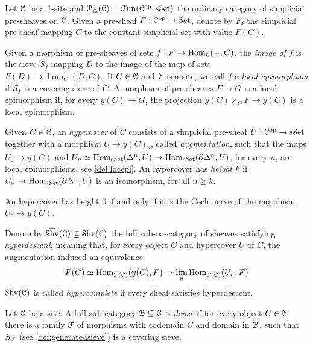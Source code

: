 \documentclass[10pt]{amsart}
\begin{document}
Let $\mathcal{C}$ be a 1-site and $\mathcal{P}_\Delta(\mathcal{C})=\mathcal{F}\mathrm{un}(\mathcal{C}^{\mathrm{op}},\mathrm{s}\mathcal{S}\mathrm{et})$ the ordinary category of simplicial pre-sheaves on $\mathcal{C}$. Given a pre-sheaf $F:\mathcal{C}^{\mathrm{op}}\to\mathcal{S}\mathrm{et}$, denote by $F_\delta$ the simplicial pre-sheaf mapping $C$ to the constant simplicial set with value $F(C)$. 
\begin{definition}\label{def:locepi}
	Given a morphism of pre-sheaves of sets $f:F\to\mathrm{Hom}_{\mathcal{C}}(-,C)$, the \emph{image of $f$} is the sieve $S_f$  mapping $D$ to the image of the map of sets $F(D)\to\hom_C(D,C)$. If $C\in\mathcal{C}$ and $\mathcal{C}$ is a site, we call $f$ a \emph{local epimorphism} if $S_f$ is a covering sieve of $C$. A morphism of pre-sheaves $F\to G$ is a local epimorphism if, for every $y(C)\to G$, the projection $y(C)\times_GF\to y(C)$ is a local epimorphism. 
\end{definition}
\begin{definition}
	Given $C\in\mathcal{C}$, an \emph{hypercover} of $C$ consists of a simplicial pre-sheaf $U:\mathcal{C}^{\mathrm{op}}\to\mathrm{s}\mathcal{S}\mathrm{et}$ together with a morphism $U\to y(C)_\delta$, called \emph{augmentation}, such that the maps $U_0\to y(C)$ and $U_n\simeq \mathrm{Hom}_{\mathrm{s}\mathcal{S}\mathrm{et}}({\Delta^n},U)\to\mathrm{Hom}_{\mathrm{s}\mathcal{S}\mathrm{et}}({\partial\Delta^n},U)$, for every $n$, are local epimorphisms, see \cref{def:locepi}. An hypercover has \emph{height $k$} if $U_n\to\mathrm{Hom}_{\mathrm{s}\mathcal{S}\mathrm{et}}(\partial\Delta^n,U)$ is an isomorphism, for all $n\geq k$. 
\end{definition}
\begin{remark}\label{rmk:cech}
	An hypercover has height 0 if and only if it is the \v Cech nerve of the morphism $U_0\to y(C)$. 
\end{remark}
\begin{definition}
	Denote by $\widehat{\mathcal{S}\mathrm{hv}}(\mathcal{C})\subseteq\mathcal{S}\mathrm{hv}(\mathcal{C})$ the full sub-$\infty$-category of sheaves satisfying \emph{hyperdescent}, meaning that, for every object $C$ and hypercover $U$ of $C$, the augmentation induced an equivalence 
	$$F(C)\simeq\mathrm{Hom}_{\mathcal{P}(\mathcal{C})}(y(C),F)\to\lim_n\mathrm{Hom}_{\mathcal{P}(\mathcal{C})}(U_n,F)$$ $\mathcal{S}\mathrm{hv}(\mathcal{C})$ is called \emph{hypercomplete} if every sheaf satisfies hyperdescent. 
\end{definition}
\begin{definition}\label{def:dense}
	Let $\mathcal{C}$ be a site. A full sub-category $\mathcal{B}\subseteq\mathcal{C}$ is \emph{dense} if for every object $C\in\mathcal{C}$ there is a family $\mathcal{F}$ of morphisms with codomain $C$ and domain in $\mathcal{B}$, such that $S_{\mathcal{F}}$ (see \cref{def:generatedsieve}) is a covering sieve. 
\end{definition}
\end{document}
